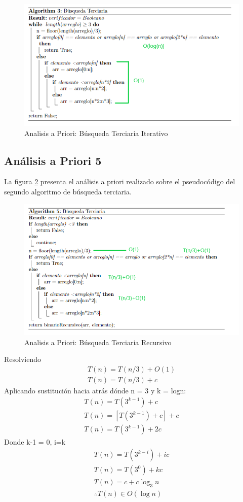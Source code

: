         \begin{figure}[htp!]
            \centering
            \includegraphics[width=0.7 \textwidth]{Images/A_Priori/priori_4.png}
            \caption{Analisis a Priori: Búsqueda Terciaria Iterativo}
            \label{fig:priori4}
        \end{figure}
    
    \newpage
    \subsection{Análisis a Priori 5}
        La figura \ref{fig:priori5} presenta el análisis a priori realizado sobre el pseudocódigo del segundo algoritmo de búsqueda terciaria.
        \begin{figure}[htp!]
            \centering
            \includegraphics[width=0.7 \textwidth]{Images/A_Priori/priori_5.png}
            \caption{Analisis a Priori: Búsqueda Terciaria Recursivo}
            \label{fig:priori5}
        \end{figure}
        Resolviendo 
        \begin{gather*}
            T(n) = T(n/3)+O(1)\\
            T(n) = T(n/3) + c
        \end{gather*}
        Aplicando sustitución hacia atrás dónde n = 3 y k = logn:
        \begin{gather*}
            T(n)= T(3^{k-1})+c\\
            T(n)= [T(3^{k-1})+c]+c\\
            T(n)= T(3^{k-1})+2c
        \end{gather*}
        Donde k-1 = 0, i=k
        \begin{gather*}
            T(n)= T(3^{k-i})+ic\\
            T(n)= T(3^{0})+kc\\
            T(n)= c + c\log_3 n\\
            \therefore  T(n)\in O(\log n)
        \end{gather*}

